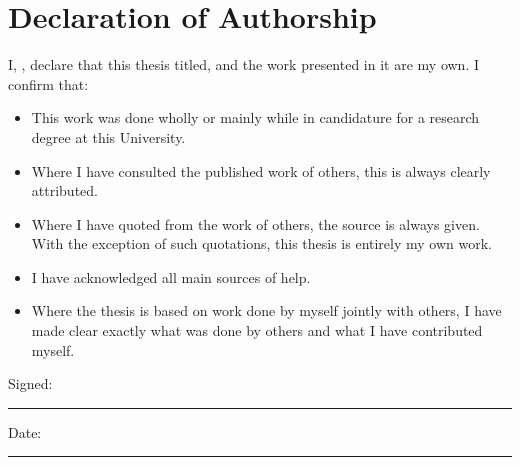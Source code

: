 

\chapter*{Declaration of Authorship}
	\noindent I, \textsc{\trauthor}, declare that this thesis titled, \textsc{\trtitle} and the work presented in it are my own. I confirm that:
	
	\begin{itemize} 
		\item This work was done wholly or mainly while in candidature for a research degree at this University.
		\item Where I have consulted the published work of others, this is always clearly attributed.
		\item Where I have quoted from the work of others, the source is always given. With the exception of such quotations, this thesis is entirely my own work.
		\item I have acknowledged all main sources of help.
		\item Where the thesis is based on work done by myself jointly with others, I have made clear exactly what was done by others and what I have contributed myself.\\
	\end{itemize}
	
	\noindent Signed:\\
	\rule[0.5em]{25em}{0.5pt} %
	
	\noindent Date:\\
	\rule[0.5em]{25em}{0.5pt} %

\cleardoublepage



